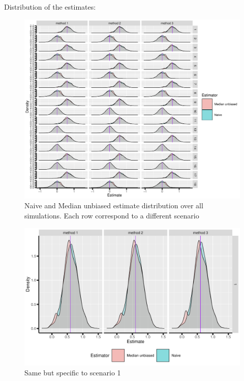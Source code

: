 \documentclass[12pt]{article}
\begin{document}
Distribution of the estimates:
\begin{figure}[!h]
\centering
\includegraphics[trim={0 0 0 0},width=1\textwidth]{./figures/gg-estimate-density.pdf}
\caption{Naive and Median unbiased estimate distribution over all simulations. Each row correspond to a different scenario}
\end{figure}

\begin{figure}[!h]
\centering
\includegraphics[trim={0 0 0 0},width=\textwidth]{./figures/gg-estimate-density-scenario1.pdf}
\caption{Same but specific to scenario 1}
\end{figure}

\clearpage
\end{document}

